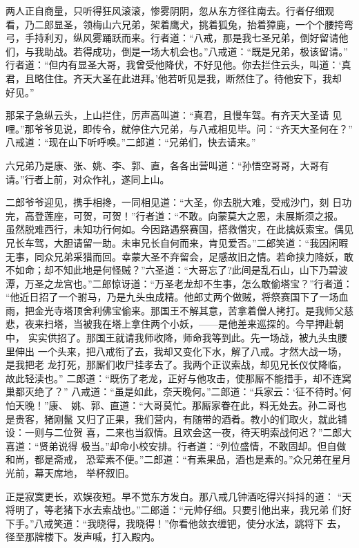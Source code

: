 两人正自商量，只听得狂风滚滚，惨雾阴阴，忽从东方径往南去。行者仔细观
看，乃二郎显圣，领梅山六兄弟，架着鹰犬，挑着狐兔，抬着獐鹿，一个个腰挎弯
弓，手持利刃，纵风雾踊跃而来。行者道：“八戒，那是我七圣兄弟，倒好留请他
们，与我助战。若得成功，倒是一场大机会也。”八戒道：“既是兄弟，极该留请。”
行者道：“但内有显圣大哥，我曾受他降伏，不好见他。你去拦住云头，叫道：‘真
君，且略住住。齐天大圣在此进拜。’他若听见是我，断然住了。待他安下，我却
好见。”

那呆子急纵云头，上山拦住，厉声高叫道：“真君，且慢车驾。有齐天大圣请
见哩。”那爷爷见说，即传令，就停住六兄弟，与八戒相见毕。问：“齐天大圣何在？”
八戒道：“现在山下听呼唤。”二郎道：“兄弟们，快去请来。”

六兄弟乃是康、张、姚、李、郭、直，各各出营叫道：“孙悟空哥哥，大哥有
请。”行者上前，对众作礼，遂同上山。

二郎爷爷迎见，携手相搀，一同相见道：“大圣，你去脱大难，受戒沙门，刻
日功完，高登莲座，可贺，可贺！”行者道：“不敢。向蒙莫大之恩，未展斯须之报。
虽然脱难西行，未知功行何如。今因路遇祭赛国，搭救僧灾，在此擒妖索宝。偶见
兄长车驾，大胆请留一助。未审兄长自何而来，肯见爱否。”二郎笑道：“我因闲暇
无事，同众兄弟采猎而回。幸蒙大圣不弃留会，足感故旧之情。若命挟力降妖，敢
不如命；却不知此地是何怪贼？”六圣道：“大哥忘了?此间是乱石山，山下乃碧波
潭，万圣之龙宫也。”二郎惊讶道：“万圣老龙却不生事，怎么敢偷塔宝？”行者道：
“他近日招了一个驸马，乃是九头虫成精。他郎丈两个做贼，将祭赛国下了一场血
雨，把金光寺塔顶舍利佛宝偷来。那国王不解其意，苦拿着僧人拷打。是我师父慈
悲，夜来扫塔，当被我在塔上拿住两个小妖，——是他差来巡探的。今早押赴朝中，
实实供招了。那国王就请我师收降，师命我等到此。先一场战，被九头虫腰里伸出
一个头来，把八戒衔了去，我却又变化下水，解了八戒。才然大战一场，是我把老
龙打死，那厮们收尸挂孝去了。我两个正议索战，却见兄长仪仗降临，故此轻渎也。”
二郎道：“既伤了老龙，正好与他攻击，使那厮不能措手，却不连窝巢都灭绝了？”
八戒道：“虽是如此，奈天晚何。”二郎道：“兵家云：‘征不待时。’何怕天晚！”康、
姚、郭、直道：“大哥莫忙。那厮家眷在此，料无处去。孙二哥也是贵客，猪刚鬣
又归了正果，我们营内，有随带的酒肴。教小的们取火，就此铺设：一则与二位贺
喜，二来也当叙情。且欢会这一夜，待天明索战何迟？”二郎大喜道：“贤弟说得
极当。”却命小校安排。行者道：“列位盛情，不敢固却。但自做和尚，都是斋戒，
恐荤素不便。”二郎道：“有素果品，酒也是素的。”众兄弟在星月光前，幕天席地，
举杯叙旧。

正是寂寞更长，欢娱夜短。早不觉东方发白。那八戒几钟酒吃得兴抖抖的道：
“天将明了，等老猪下水去索战也。”二郎道：“元帅仔细。只要引他出来，我兄弟
们好下手。”八戒笑道：“我晓得，我晓得！”你看他敛衣缠钯，使分水法，跳将下
去，径至那牌楼下。发声喊，打入殿内。

